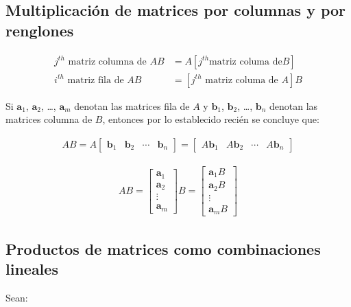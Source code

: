 \documentclass[a4paper,12pt]{article}
\begin{document}
\subsection{Multiplicación de matrices por columnas y por renglones}

\begin{align*}
  j^{th} \textrm{ matriz columna de } AB &= A \left[ j^{th} \textrm{matriz columa de} B
  \right] \\
  i^{th}\textrm{ matriz fila de } AB &= \left[ j^{th} \textrm{ matriz columa de } A
  \right] B
\end{align*}

Si $\textbf{a}_1$, $\textbf{a}_2$, \ldots, $\textbf{a}_m$ denotan las matrices
fila de $A$ y $\textbf{b}_1$, $\textbf{b}_2$, \ldots, $\textbf{b}_n$ denotan
las matrices columna de $B$, entonces por lo establecido recién se concluye
que:

\begin{align*}
  AB =
  A\begin{bmatrix}\textbf{b}_1&\textbf{b}_2&\cdots&\textbf{b}_n \end{bmatrix}
    =
    \begin{bmatrix}A\textbf{b}_1&A\textbf{b}_2&\cdots&A\textbf{b}_n\end{bmatrix}
\end{align*}

\begin{align*}
  AB = \begin{bmatrix}
    \textbf{a}_1 \\
    \textbf{a}_2 \\
    \vdots       \\
    \textbf{a}_m
  \end{bmatrix} B = \begin{bmatrix}
    \textbf{a}_1B \\
    \textbf{a}_2B \\
    \vdots        \\
    \textbf{a}_mB
  \end{bmatrix}
\end{align*}

\subsection{Productos de matrices como combinaciones lineales}

Sean:
\end{document}
